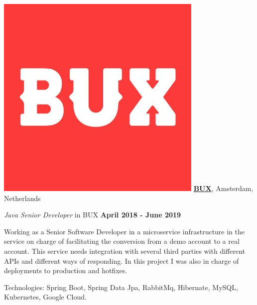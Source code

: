 \includegraphics[scale=0.1]{companies/bux.jpg} \href{http://www.getbux.com/}{\textbf{BUX}},
Amsterdam, Netherlands
\begin{outerlist}
\item[] \textit{Java Senior Developer} in BUX%
        \hfill \textbf{April 2018 - June 2019}

Working as a Senior Software Developer in a microservice infrastructure in the service on charge of facilitating the conversion from a demo account to a real account. 
This service needs integration with several third parties with different APIs and different ways of responding. In this project I was also in charge of deployments to production and hotfixes.
\begin{innerlist}
\item Technologies: Spring Boot, Spring Data Jpa, RabbitMq, Hibernate, MySQL, Kubernetes, Google Cloud.
\end{innerlist}
\end{outerlist}

